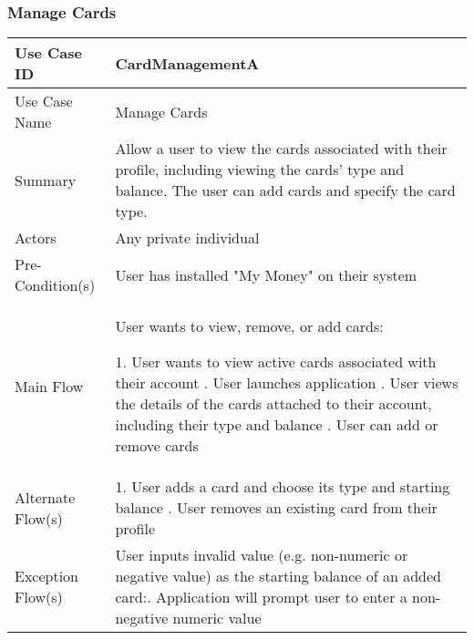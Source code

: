 \documentclass[12pt]{article}
\begin{document}
\subsubsection{Manage Cards} \label{uc:1}
\begin{center}

\begin{tabular}{| p{5cm} | p{10cm} |}

\hline



Use Case ID  & CardManagementA\\

\hline

Use Case Name  & Manage Cards\\

\hline

Summary  & Allow a user to view the cards associated with their profile, including viewing the cards' type and balance. The user can add cards and specify the card type. \\

\hline

Actors  & Any private individual\\

\hline

Pre-Condition(s) &  User has installed "My Money" on their system \\

\hline

Main Flow & User wants to view, remove, or add cards:\newline

1. User wants to view active cards associated with their account \newline
2. User launches application \newline
3. User views the details of the cards attached to their account, including their type and balance \newline
4. User can add or remove cards\\

\hline

Alternate Flow(s) & 1. User adds a card and choose its type and starting balance \newline
2. User removes an existing card from their profile \\
\hline
Exception Flow(s) & User inputs invalid value (e.g. non-numeric or negative value) as the starting balance of an added card:\newline
1. Application will prompt user to enter a non-negative numeric value\\
\hline



\end{tabular}

\end{center}
\end{document}
